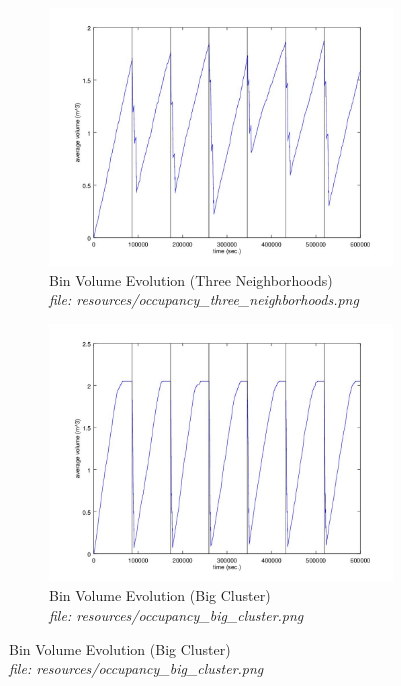 \documentclass{article}
\begin{document}
		\begin{figure}[H]
			\centering
			\begin{subfigure}[b]{.5\columnwidth}
				\includegraphics[width=\textwidth]{resources/occupancy_three_neighborhoods.jpg}
				\caption{Bin Volume Evolution (Three Neighborhoods) \\\textit{file: resources/occupancy\_three\_neighborhoods.png}}
				\label{fig:fig6a}
			\end{subfigure}\hfill%
			\begin{subfigure}[b]{.5\columnwidth}
				\includegraphics[width=\textwidth]{resources/occupancy_big_cluster.jpg}
				\caption{Bin Volume Evolution (Big Cluster) \\\textit{file: resources/occupancy\_big\_cluster.png}}
				\label{fig:fig6b}
			\end{subfigure}
			\label{fig:fig6}
		\end{figure}
\end{document}
